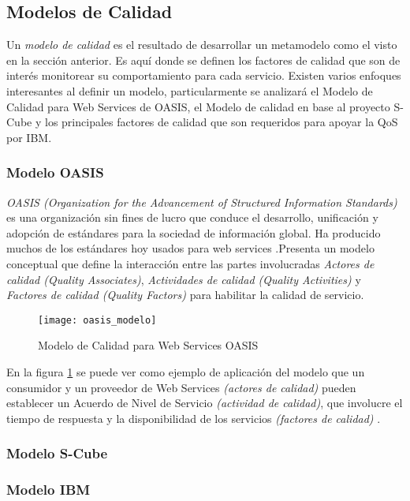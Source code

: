 \subsection{Modelos de Calidad}
\label{MarcoConceptual:modelos_calidad}
Un \emph{modelo de calidad} es el resultado de desarrollar un metamodelo como el visto en la sección anterior. Es aquí donde se definen los factores de calidad que son de interés monitorear su comportamiento para cada servicio. Existen varios enfoques interesantes al definir un modelo, particularmente se analizará el Modelo de Calidad para Web Services de OASIS, el Modelo de calidad en base al proyecto S-Cube y los principales factores de calidad que son requeridos para apoyar la QoS por IBM.
\subsubsection{Modelo OASIS}
\label{MarcoConceptual:modelo_OASIS}
\emph{OASIS (Organization for the Advancement of Structured Information Standards)} es una organización sin fines de lucro que conduce el desarrollo, unificación y adopción de estándares para la sociedad de información global. Ha producido muchos de los estándares hoy usados para web services \cite{OASIS:def}.Presenta un modelo conceptual que define la interacción entre las partes involucradas \emph{Actores de calidad (Quality Associates)}, \emph{Actividades de calidad (Quality Activities)} y \emph{Factores de calidad (Quality Factors)} para habilitar la calidad de servicio.
  \begin{figure}[h]
    \centering
    \texttt{[image: oasis\_modelo]}
    \caption{Modelo de Calidad para Web Services OASIS}
    \label{figura:oasis_modelo}
  \end{figure}
En la figura \ref{figura:oasis_modelo} se puede ver como ejemplo de aplicación del modelo que un consumidor y un proveedor de Web Services \emph{(actores de calidad)} pueden establecer un Acuerdo de Nivel de Servicio \emph{(actividad de calidad)}, que involucre el tiempo de respuesta y la disponibilidad de los servicios \emph{(factores de calidad)} \cite{Tesis:LauraGonzalez:PlataformaESB}.
\subsubsection{Modelo S-Cube}
\label{MarcoConceptual:modelo_SCube}

\subsubsection{Modelo IBM}
\label{MarcoConceptual:modelo_IBM}

